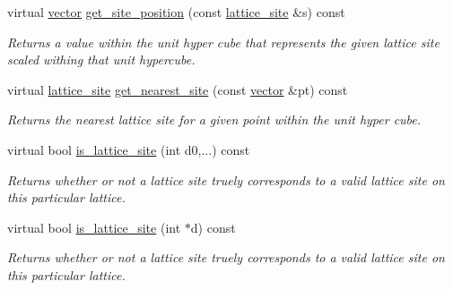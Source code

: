 \begin{DoxyCompactItemize}
\mbox{\label{classsisl_1_1body__centered__cubic_a67cbe56fa247a8f787db629c59a2f3a9}} 
virtual \hyperlink{namespacesisl_a2069bd5374a9be042ff3ce3306d41e1a}{vector} \hyperlink{classsisl_1_1body__centered__cubic_a67cbe56fa247a8f787db629c59a2f3a9}{get\+\_\+site\+\_\+position} (const \hyperlink{namespacesisl_acd18feee4026583db6185df2b25434aa}{lattice\+\_\+site} \&s) const
\begin{DoxyCompactList}\small\item\em Returns a value within the unit hyper cube that represents the given lattice site scaled withing that unit hypercube. \end{DoxyCompactList}\item 
\mbox{\label{classsisl_1_1body__centered__cubic_a4ee5d6c2c2ce3154aa62ca53a222510e}} 
virtual \hyperlink{namespacesisl_acd18feee4026583db6185df2b25434aa}{lattice\+\_\+site} \hyperlink{classsisl_1_1body__centered__cubic_a4ee5d6c2c2ce3154aa62ca53a222510e}{get\+\_\+nearest\+\_\+site} (const \hyperlink{namespacesisl_a2069bd5374a9be042ff3ce3306d41e1a}{vector} \&pt) const
\begin{DoxyCompactList}\small\item\em Returns the nearest lattice site for a given point within the unit hyper cube. \end{DoxyCompactList}\item 
\mbox{\label{classsisl_1_1body__centered__cubic_a0cc4d7416cc84cf8914677131215b9ee}} 
virtual bool \hyperlink{classsisl_1_1body__centered__cubic_a0cc4d7416cc84cf8914677131215b9ee}{is\+\_\+lattice\+\_\+site} (int d0,...) const
\begin{DoxyCompactList}\small\item\em Returns whether or not a lattice site truely corresponds to a valid lattice site on this particular lattice. \end{DoxyCompactList}\item 
\mbox{\label{classsisl_1_1body__centered__cubic_a98d4d9250d92c3677c6b8d58e2f4d034}} 
virtual bool \hyperlink{classsisl_1_1body__centered__cubic_a98d4d9250d92c3677c6b8d58e2f4d034}{is\+\_\+lattice\+\_\+site} (int $\ast$d) const
\begin{DoxyCompactList}\small\item\em Returns whether or not a lattice site truely corresponds to a valid lattice site on this particular lattice. \end{DoxyCompactList}\item 

\end{DoxyCompactItemize}
